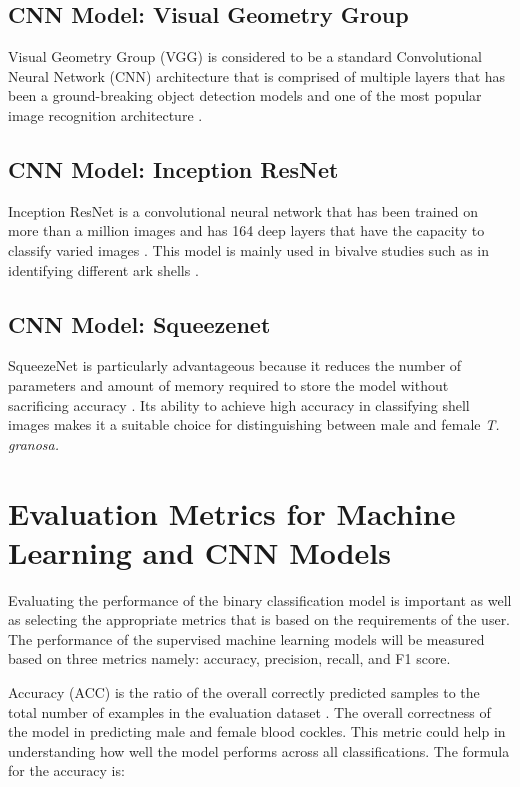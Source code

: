 \subsection{CNN Model: Visual Geometry Group}
Visual Geometry Group (VGG) is considered to be a standard Convolutional Neural Network (CNN) architecture that is comprised of multiple layers that has been a ground-breaking object detection models and one of the most popular image recognition architecture \cite{boesch2021}. 

\subsection{CNN Model: Inception ResNet}
Inception ResNet is a convolutional neural network that has been trained on more than a million images and has 164 deep layers that have the capacity to classify varied images \cite{mathworks}. This model is mainly used in bivalve studies such as in identifying different ark shells \cite{kim2024}.  

\subsection{CNN Model: Squeezenet}
SqueezeNet is particularly advantageous because it reduces the number of parameters and amount of memory required to store the model without sacrificing accuracy \cite{koonce2021}. Its ability to achieve high accuracy in classifying shell images makes it a suitable choice for distinguishing between male and female \textit{T. granosa.}

\section{Evaluation Metrics for Machine Learning and CNN Models}
Evaluating the performance of the binary classification model is important as well as selecting the appropriate metrics that is based on the requirements of the user. The performance of the supervised machine learning models will be measured based on three metrics namely: accuracy, precision, recall, and F1 score. 

Accuracy (ACC) is the ratio of the overall correctly predicted samples to the total number of examples in the evaluation dataset \cite{cui2020}. The overall correctness of the model in predicting male and female blood cockles. This metric could help in understanding how well the model performs across all classifications. The formula for the accuracy is: 

